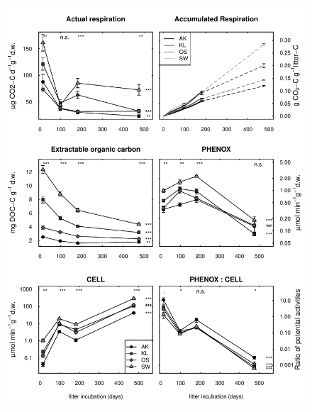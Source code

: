 \documentclass[10pt]{article}
\begin{document}
\begin{flushleft}
% 
\begin{figure}[!ht]
\begin{center}
\includegraphics{ligpaper-enz}
\end{center}

\end{figure}
\end{flushleft}
\end{document}
